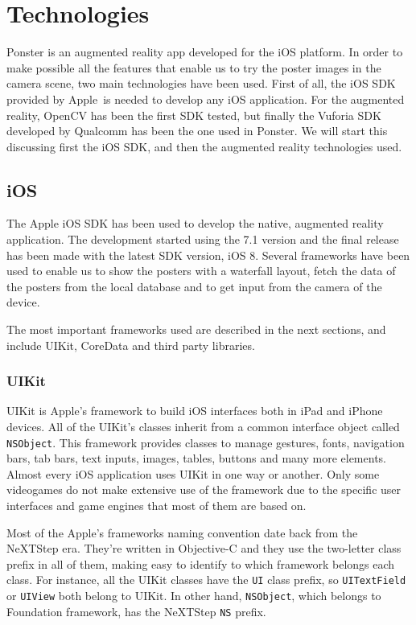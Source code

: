 \chapter{Technologies}
Ponster is an augmented reality app developed for the iOS platform. In order to make
possible all the features that enable us to try the poster images in the camera
scene, two main technologies have been used. First of all, the iOS SDK provided by
Apple\textregistered ~is needed to develop any iOS application. For the augmented reality, OpenCV
has been the first SDK tested, but finally the Vuforia SDK\cite{vuforia} developed
by Qualcomm has been the one used in Ponster. We will start this
discussing first the iOS SDK, and then the augmented reality technologies used.

\section{iOS}
The Apple iOS SDK has been used to develop the native, augmented reality
application. The development started using the 7.1 version and the final release has
been made with the latest SDK version, iOS 8. Several frameworks have been used to
enable us to show the posters with a waterfall layout, fetch the data of the posters
from the local database and to get input from the camera of the device.

The most important frameworks used are described in the next sections, and include
UIKit, CoreData and third party libraries.

\subsection{UIKit}
UIKit\cite{uikit} is Apple's framework to build iOS interfaces both in iPad and
iPhone devices. All of the UIKit's classes inherit from a common interface object
called \texttt{NSObject}. This framework provides classes to manage gestures, fonts,
navigation bars, tab bars, text inputs, images, tables, buttons and many more
elements. Almost every iOS application uses UIKit in one way or another. Only some
videogames do not make extensive use of the framework due to the specific user
interfaces and game engines that most of them are based on.

Most of the Apple's frameworks naming convention date back from the NeXTStep era. They're written in
Objective-C and they use the two-letter class prefix in all of them, making easy to
identify to which framework belongs each class. For instance, all the UIKit classes
have the \texttt{UI} class prefix, so \texttt{UITextField} or \texttt{UIView} both
belong to UIKit. In other hand, \texttt{NSObject}, which belongs to Foundation
framework, has the NeXTStep \texttt{NS} prefix.

